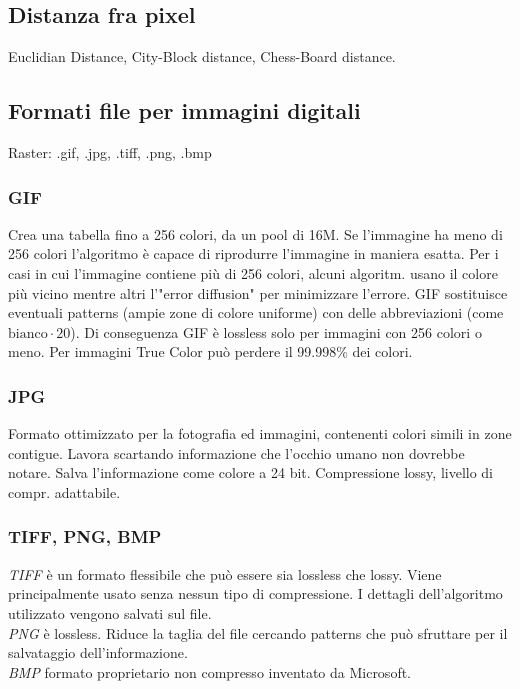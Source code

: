 \documentclass[8pt,a4paper]{article}
\begin{document}
\begin{multicols}{5}
    \subsection{Distanza fra pixel}
    Euclidian Distance, City-Block distance, Chess-Board distance.
    
    \subsection{Formati file per immagini digitali}
    Raster: .gif, .jpg, .tiff, .png, .bmp

    \subsubsection{GIF}
    Crea una tabella fino a 256 colori, da un pool di 16M. Se l'immagine ha meno di 256
    colori l'algoritmo è capace di riprodurre l'immagine in maniera esatta.
    Per i casi in cui l'immagine contiene più di 256 colori, alcuni algoritm. 
    usano il colore più vicino mentre altri l'"error diffusion" per minimizzare
    l'errore. GIF sostituisce eventuali patterns (ampie zone di colore uniforme)
    con delle abbreviazioni (come $\text{bianco} \cdot 20$). Di conseguenza
    GIF è lossless solo per immagini con 256 colori o meno. Per immagini
    True Color può perdere il 99.998\% dei colori.

    \subsubsection{JPG}
    Formato ottimizzato per la fotografia ed immagini, contenenti colori simili
    in zone contigue.
    Lavora scartando informazione che l'occhio umano non dovrebbe notare.
    Salva l'informazione come colore a 24 bit. Compressione lossy, livello di compr.
    adattabile.

    \subsubsection{TIFF, PNG, BMP}
    \textit{TIFF} è un formato flessibile che può essere sia lossless che lossy.
    Viene principalmente usato senza nessun tipo di compressione.
    I dettagli dell'algoritmo utilizzato vengono salvati sul file.
    \\
    \textit{PNG} è lossless. Riduce la taglia del file cercando patterns che può sfruttare
    per il salvataggio dell'informazione.\\
    \textit{BMP} formato proprietario non compresso inventato da Microsoft. \\


\end{multicols}
\end{document}
